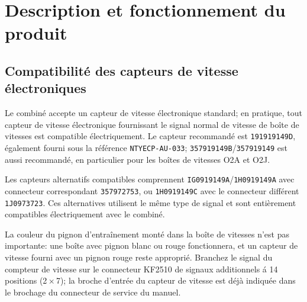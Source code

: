 \chapter{Description et fonctionnement du produit}\label{ch:description}

\section{Compatibilit\'e des capteurs de vitesse \'electroniques}
Le combin\'e accepte un capteur de vitesse \'electronique standard; en pratique, tout capteur de vitesse \'electronique fournissant le signal normal de vitesse de bo\^ite de vitesses est compatible \'electriquement.
Le capteur recommand\'e est \texttt{191919149D}, \'egalement fourni sous la r\'ef\'erence \texttt{NTYECP-AU-033}; \texttt{357919149B}/\texttt{357919149} est aussi recommand\'e, en particulier pour les bo\^ites de vitesses O2A et O2J.

Les capteurs alternatifs compatibles comprennent \texttt{IG0919149A}/\texttt{1H0919149A} avec connecteur correspondant \texttt{357972753}, ou \texttt{1H0919149C} avec le connecteur diff\'erent \texttt{1J0973723}.
Ces alternatives utilisent le m\^eme type de signal et sont enti\`erement compatibles \'electriquement avec le combin\'e.

La couleur du pignon d'entra\^inement mont\'e dans la bo\^ite de vitesses n'est pas importante: une bo\^ite avec pignon blanc ou rouge fonctionnera, et un capteur de vitesse fourni avec un pignon rouge reste appropri\'e.
Branchez le signal du compteur de vitesse sur le connecteur KF2510 de signaux additionnels \'a 14 positions (2\,$\times$\,7); la broche d'entr\'ee du capteur de vitesse est d\'ej\`a indiqu\'ee dans le brochage du connecteur de service du manuel.
